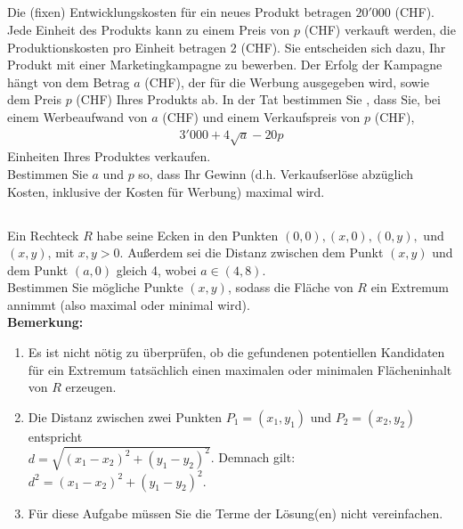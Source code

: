 \subsection*{}
Die (fixen) Entwicklungskosten für ein neues Produkt betragen $ 20'000 $ (CHF).
Jede Einheit des Produkts kann zu einem Preis von $ p $ (CHF) verkauft werden, 
die Produktionskosten pro Einheit betragen $ 2 $ (CHF).
Sie entscheiden sich dazu, Ihr Produkt mit einer Marketingkampagne zu bewerben.
Der Erfolg der Kampagne hängt von dem Betrag $ a $ (CHF),
der für die Werbung ausgegeben wird, sowie dem Preis $ p $ (CHF) Ihres Produkts ab.
In der Tat bestimmen Sie , dass Sie, bei einem Werbeaufwand von $ a $ (CHF) und einem Verkaufspreis von $ p $ (CHF),
\begin{align*}
3'000 + 4 \sqrt{a} - 20 p
\end{align*}
Einheiten Ihres Produktes verkaufen.\\
Bestimmen Sie $ a $ und $ p $ so, dass Ihr Gewinn (d.h. Verkaufserlöse abzüglich Kosten, inklusive der Kosten für Werbung) maximal wird.
\ \\
\subsection*{}
Ein Rechteck $ R $ habe seine Ecken in den Punkten $ (0,0),(x,0),(0,y), $ und $ (x,y) $, mit $ x,y > 0 $.
Außerdem sei die Distanz zwischen dem Punkt $ (x,y)  $ und dem Punkt $ (a,0) $ gleich 4, wobei $ a \in (4,8) $.\\
Bestimmen Sie mögliche Punkte $ (x,y) $, sodass die Fläche von $ R $ ein Extremum annimmt (also maximal oder minimal wird).\\
\textbf{Bemerkung:} 
\begin{enumerate}[label=(\arabic*)]
	\item Es ist nicht nötig zu überprüfen, ob die gefundenen potentiellen Kandidaten für ein Extremum tatsächlich einen maximalen oder minimalen Flächeninhalt von $ R $ erzeugen.
	\item Die Distanz zwischen zwei Punkten $ P_1 = (x_1,y_1) $ und $ P_2 = ( x_2,y_2) $ entspricht\\
	$ d = \sqrt{(x_1 - x_2)^2 + (y_1 - y_2)^2} $.
	Demnach gilt: $ d^2 = (x_1 -x_2)^2 + (y_1 - y_2)^2 $.
	\item  Für diese Aufgabe müssen Sie die Terme der Lösung(en) nicht vereinfachen.
\end{enumerate}

\newpage


